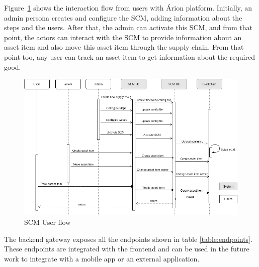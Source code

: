 Figure~\ref{fig:sequenceDiagram} shows the interaction flow from users with Árion platform. Initially, an admin persona creates and configure the SCM, adding information about the steps and the users. After that, the admin can activate this SCM, and from that point, the actors can interact with the SCM to provide information about an asset item and also move this asset item through the supply chain. From that point too, any user can track an asset item to get information about the required good.

\begin{figure}[ht]
\begin{center}
  \includegraphics[scale=0.5]{images/SequenceDiagram.png}
\caption{SCM User flow}
\label{fig:sequenceDiagram}
\end{center}
\end{figure}


The backend gateway exposes all the endpoints shown in table \ref{table:endpoints}. These endpoints are integrated with the frontend and can be used in the future work to integrate with a mobile app or an external application.


